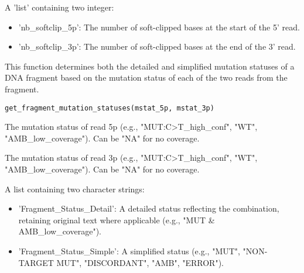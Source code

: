 \documentclass[a4paper]{book}
\begin{document}
%
\begin{Value}
A 'list' containing two integer:
\begin{itemize}

\item{} 'nb\_softclip\_5p': The number of soft-clipped bases at the start of
the 5' read.
\item{} 'nb\_softclip\_3p': The number of soft-clipped bases at the end of
the 3' read.

\end{itemize}

\end{Value}
%
\begin{Description}
This function determines both the detailed and simplified mutation statuses of a DNA
fragment based on the mutation status of each of the two reads from the fragment.
\end{Description}
%
\begin{Usage}
\begin{verbatim}
get_fragment_mutation_statuses(mstat_5p, mstat_3p)
\end{verbatim}
\end{Usage}
%
\begin{Arguments}
\begin{ldescription}
\item[\code{mstat\_5p}] The mutation status of read 5p (e.g., "MUT:C>T\_high\_conf", "WT", "AMB\_low\_coverage").
Can be "NA" for no coverage.

\item[\code{mstat\_3p}] The mutation status of read 3p (e.g., "MUT:C>T\_high\_conf", "WT", "AMB\_low\_coverage").
Can be "NA" for no coverage.
\end{ldescription}
\end{Arguments}
%
\begin{Value}
A list containing two character strings:
\begin{itemize}

\item{} 'Fragment\_Status\_Detail': A detailed status reflecting the combination,
retaining original text where applicable (e.g., "MUT \& AMB\_low\_coverage").
\item{} 'Fragment\_Status\_Simple': A simplified status (e.g., "MUT", "NON-TARGET MUT",
"DISCORDANT", "AMB", "ERROR").

\end{itemize}

\end{Value}
\end{document}
